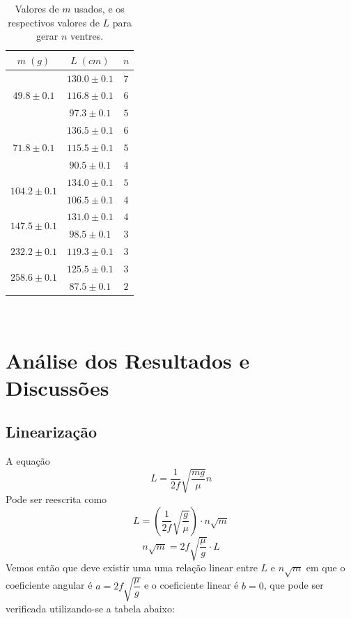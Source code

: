 \documentclass[12pt,a4paper]{article}
\begin{document}
\begin{table}[!htbp]
\centering
\def\arraystretch{1.3}
\caption{Valores de $m$ usados, e os respectivos valores de $L$ para gerar $n$ ventres.}
\label{Resultados}
\begin{tabular}{|c|c|c|}
\hline
$m \; (g)$ & $L \; (cm)$ & $n$\\
\hline
\multirow{3}{*}{$49.8 \pm 0.1$} & $130.0 \pm 0.1$ & $7$\\
$            $ & $116.8 \pm 0.1$ & $6$\\
$            $ & $ 97.3 \pm 0.1$ & $5$\\
\hline
\multirow{3}{*}{$71.8 \pm 0.1$} & $136.5 \pm 0.1$ & $6$\\
$            $ & $115.5 \pm 0.1$ & $5$\\
$            $ & $ 90.5 \pm 0.1$ & $4$\\
\hline
\multirow{2}{*}{$104.2 \pm 0.1$} & $134.0 \pm 0.1$ & $5$\\
$             $ & $106.5 \pm 0.1$ & $4$\\
\hline
\multirow{2}{*}{$147.5 \pm 0.1$} & $131.0 \pm 0.1$ & $4$\\
$             $ & $ 98.5 \pm 0.1$ & $3$\\
\hline
$232.2 \pm 0.1$ & $119.3 \pm 0.1$ & $3$\\
\hline
\multirow{2}{*}{$258.6 \pm 0.1$} & $125.5 \pm 0.1$ & $3$\\
$             $ & $ 87.5 \pm 0.1$ & $2$\\
\hline

\end{tabular} \\

\end{table}


\section{Análise dos Resultados e Discussões}
\subsection{Linearização}
A equação
$$ L = \dfrac{1}{2f} \sqrt{\dfrac{mg}{\mu}} n $$
Pode ser reescrita como
$$ L = (\dfrac{1}{2f} \sqrt{\dfrac{g}{\mu}}) \cdot n\sqrt{m} $$
$$ n \sqrt{m} = 2f\sqrt{\frac{\mu}{g}} \cdot L $$
Vemos então que deve existir uma uma relação linear entre $L$ e $n\sqrt{m}$ em que o coeficiente angular é $a = 2f \sqrt{\dfrac{\mu}{g}}$ e o coeficiente linear é $b = 0$, que pode ser verificada utilizando-se a tabela abaixo:
\end{document}
